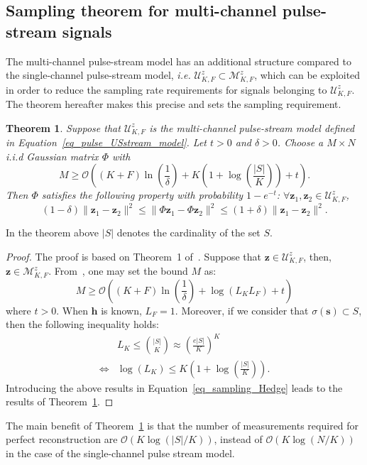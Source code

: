 \documentclass{article}
\newtheorem{theorem}{Theorem}
\newcommand{\ie}{\textit{i.e.}}
\newcommand{\vect}[1]{\bm{#1}}
\newcommand{\mat}[1]{\mathsf{#1}}
\theoremstyle{definition}
\begin{document}
\subsection{Sampling theorem for multi-channel pulse-stream signals}
\label{subsec_sampling_pulse_stream}
The multi-channel pulse-stream model has an additional structure compared to the single-channel pulse-stream model, \ie{} $\mathcal{U}^z_{K,F} \subset \mathcal{M}^z_{K,F}$, which can be exploited in order to reduce the sampling rate requirements for signals belonging to $\mathcal{U}^z_{K,F}$. The theorem hereafter makes this precise and sets the sampling requirement.
\begin{theorem}
	\label{th_stream_pulse_us}
	Suppose that $\mathcal{U}^z_{K,F}$ is the multi-channel pulse-stream model defined in Equation~\eqref{eq_pulse_USstream_model}. Let $t > 0$ and $\delta > 0$. Choose a $M \times N$ i.i.d Gaussian matrix $\mat{\Phi}$ with 
	\begin{equation*}
	M \geq \mathcal{O} \left(\left(K + F\right) \ln \left(\frac{1}{\delta} \right) + K \left( 1 + \log \left(\frac{|S|}{K}\right)\right) + t\right).
	\end{equation*} 
	Then $\mat{\Phi}$ satisfies the following property with probability $1-e^{-t}$: $\forall \vect{z}_1, \vect{z}_2 \in \mathcal{U}^z_{K,F}$, 
	\begin{equation*}
	\left(1- \delta\right) \| \vect{z}_1 - \vect{z}_2\|^2 \leq \| \mat{\Phi} \vect{z}_1 - \mat{\Phi} \vect{z}_2\|^2\leq \left(1+ \delta\right) \| \vect{z}_1 - \vect{z}_2\|^2.
	\end{equation*}
\end{theorem}
In the theorem above $|S|$ denotes the cardinality of the set $S$.
\begin{proof}
	The proof is based on Theorem~\num{1} of~\cite{Hedge_TSP_2011}. Suppose that $\vect{z} \in \mathcal{U}^z_{K,F}$, then, $\vect{z} \in \mathcal{M}^z_{K,F}$. From~\cite{Hedge_TSP_2011}, one may set the bound $M$ as:
	\begin{equation}
		\label{eq_sampling_Hedge}
		M \geq \mathcal{O} \left(\left(K + F\right) \ln \left(\frac{1}{\delta}\right) + \log \left(L_K L_F\right) + t\right)
	\end{equation} 
	where $t > 0$. When $\vect{h}$ is known, $L_F = 1$. Moreover, if we consider that $\sigma \left(\vect{s}\right) \subset S$, then the following inequality holds:
	\begin{align*}
		&L_K \leq {{|S|}\choose{K}} \approx \left(\frac{e|S|}{K}\right)^K \\
		\Leftrightarrow & \log \left(L_K\right) \leq K \left(1 + \log\left(\frac{|S|}{K}\right)\right).
	\end{align*}
	Introducing the above results in Equation~\eqref{eq_sampling_Hedge} leads to the results of Theorem~\ref{th_stream_pulse_us}.
\end{proof}
The main benefit of Theorem~\ref{th_stream_pulse_us} is that the number of measurements required for perfect reconstruction are $\mathcal{O}\left(K \log \left(|S|/K\right)\right)$, instead of $\mathcal{O}\left(K \log \left(N/K\right)\right)$ in the case of the single-channel pulse stream model.
\end{document}
